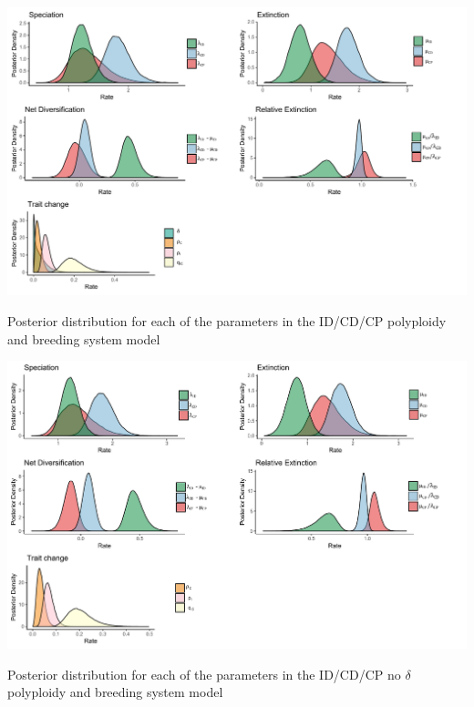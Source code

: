 \begin{suppfigure}
\includegraphics[width=\textwidth]{musseDPSIposteriordist.pdf}
\caption{Posterior distribution for each of the parameters in the ID/CD/CP polyploidy and breeding system model} %
\label{suppfigure:IDCDCP}
\end{suppfigure}

\begin{suppfigure}
\includegraphics[width=\textwidth]{musseDPSInodipposteriordist.pdf}
\caption{Posterior distribution for each of the parameters in the ID/CD/CP no $\delta$ polyploidy and breeding system model} %
\label{suppfigure:IDCDCPnodip}
\end{suppfigure}

